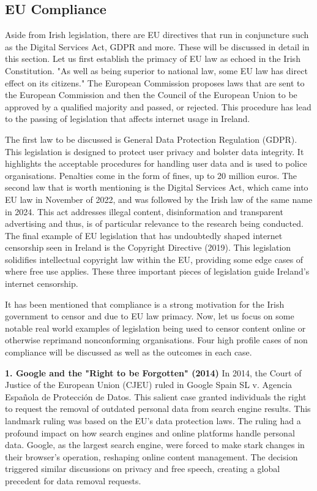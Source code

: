 \subsection{EU Compliance}
Aside from Irish legislation, there are EU directives that run in conjuncture such as the Digital Services Act, GDPR and more. These will be discussed in detail in this section. Let us first establish the primacy of EU law as echoed in the Irish Constitution. "As well as being superior to national law, some EU law has direct effect on its citizens." \cite{citizensinformation2025} The European Commission proposes laws that are sent to the European Commission and then the Council of the European Union to be approved by a qualified majority and passed, or rejected. \cite{europa2025} This procedure has lead to the passing of legislation that affects internet usage in Ireland. 

The first law to be discussed is General Data Protection Regulation (GDPR). This legislation is designed to protect user privacy and bolster data integrity. It highlights the acceptable procedures for handling user data and is used to police organisations. Penalties come in the form of fines, up to 20 million euros. \cite{gdprinfo2025} The second law that is worth mentioning is the Digital Services Act, which came into EU law in November of 2022, and was followed by the Irish law of the same name in 2024. \cite{enterprisegovie2025} \cite{irishstatutebook2024} This act addresses illegal content, disinformation and transparent advertising and thus, is of particular relevance to the research being conducted. The final example of EU legislation that has undoubtedly shaped internet censorship seen in Ireland is the Copyright Directive (2019). This legislation solidifies intellectual copyright law within the EU, providing some edge cases of where free use applies. \cite{EUCopyright} These three important pieces of legislation guide Ireland's internet censorship. 

It has been mentioned that compliance is a strong motivation for the Irish government to censor and due to EU law primacy. Now, let us focus on some notable real world examples of legislation being used to censor content online or otherwise reprimand nonconforming organisations. Four high profile cases of non compliance will be discussed as well as the outcomes in each case. 

\textbf{1. Google and the "Right to be Forgotten" (2014)}
In 2014, the Court of Justice of the European Union (CJEU) ruled in Google Spain SL v. Agencia Española de Protección de Datos. This salient case granted individuals the right to request the removal of outdated personal data from search engine results. \cite{google2014} This landmark ruling was based on the EU's data protection laws. The ruling had a profound impact on how search engines and online platforms handle personal data. Google, as the largest search engine, were forced to make stark changes in their browser's operation, reshaping online content management. The decision triggered similar discussions on privacy and free speech, creating a global precedent for data removal requests.

